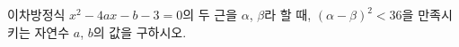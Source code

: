 이차방정식 $x^2-4ax-b-3=0$의 두 근을 $\alpha$, $\beta$라 할 때, $(\alpha-\beta)^2<36$을 만족시키는 자연수 $a$, $b$의 값을 구하시오.
